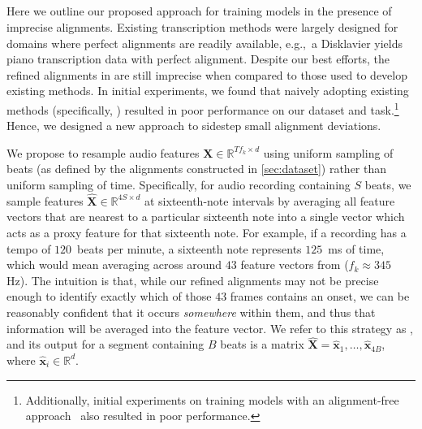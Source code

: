 \subsection{\Beatpooling}
\label{sec:beatpool}

Here we outline our proposed approach for training models in the presence of imprecise alignments. 
Existing transcription methods were largely designed for domains where perfect alignments are readily available, e.g.,~a Disklavier yields piano transcription data with perfect alignment. 
Despite our best efforts, the refined alignments in \hooktheory{} are still imprecise when compared to those used to develop existing methods. 
In initial experiments, we found that naively adopting existing methods (specifically, \cite{hawthorne2017onsets,hawthorne2021sequence}) resulted in poor performance on our dataset and task.\footnote{Additionally, initial experiments on training models with an alignment-free approach~\cite{graves2006connectionist} also resulted in poor performance.} 
Hence, we designed a new approach to sidestep small alignment deviations.

We propose to resample audio features $\bm{X} \in \mathbb{R}^{Tf_k \times d}$ using uniform sampling of beats (as defined by the alignments constructed in \cref{sec:dataset}) rather than uniform sampling of time. 
Specifically, for audio recording containing $S$ beats, we sample features $\hat{\bm{X}} \in \mathbb{R}^{4S \times d}$ at sixteenth-note intervals by averaging all feature vectors that are nearest to a particular sixteenth note into a single vector which acts as a proxy feature for that sixteenth note. 
For example, if a recording has a tempo of $120$~beats per minute, a sixteenth note represents $125$~ms of time, which would mean averaging across around $43$ feature vectors from \jukebox{} (${f_k \approx 345}$ Hz). 
The intuition is that, while our refined alignments may not be precise enough to identify exactly which of those $43$ frames contains an onset, we can be reasonably confident that it occurs \emph{somewhere} within them, and thus that information will be averaged into the feature vector.
We refer to this strategy as \emph{\beatpooling}, and its output for a segment containing $B$ beats is a matrix ${\hat{\bm{X}} = \hat{\bm{x}}_1, \ldots, \hat{\bm{x}}_{4B}}$, where ${\hat{\bm{x}}_i \in \mathbb{R}^d}$. 


